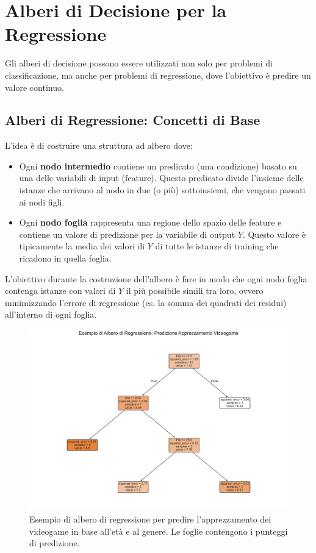 \documentclass{article}
\begin{document}
\section{Alberi di Decisione per la Regressione}

Gli alberi di decisione possono essere utilizzati non solo per problemi di classificazione, ma anche per problemi di regressione, dove l'obiettivo è predire un valore continuo.

\subsection{Alberi di Regressione: Concetti di Base}
L'idea è di costruire una struttura ad albero dove:
\begin{itemize}
    \item Ogni \textbf{nodo intermedio} contiene un predicato (una condizione) basato su una delle variabili di input (feature). Questo predicato divide l'insieme delle istanze che arrivano al nodo in due (o più) sottoinsiemi, che vengono passati ai nodi figli.
    \item Ogni \textbf{nodo foglia} rappresenta una regione dello spazio delle feature e contiene un valore di predizione per la variabile di output $Y$. Questo valore è tipicamente la media dei valori di $Y$ di tutte le istanze di training che ricadono in quella foglia.
\end{itemize}
L'obiettivo durante la costruzione dell'albero è fare in modo che ogni nodo foglia contenga istanze con valori di $Y$ il più possibile simili tra loro, ovvero minimizzando l'errore di regressione (es. la somma dei quadrati dei residui) all'interno di ogni foglia.

\begin{figure}[H]
    \centering
    \includegraphics[width=1\textwidth]{images/regression_tree_example.pdf}
    \caption{Esempio di albero di regressione per predire l'apprezzamento dei videogame in base all'età e al genere. Le foglie contengono i punteggi di predizione.}
    \label{fig:regression_tree_example}
\end{figure}
\end{document}
